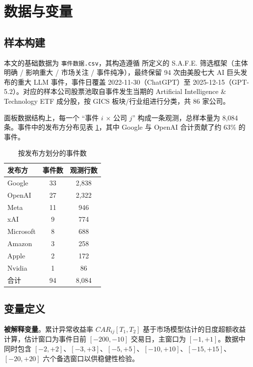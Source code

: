 \documentclass[11pt]{ctexart}
\begin{document}
\section{数据与变量}
\label{sec:data}

\subsection{样本构建}

本文的基础数据为 \texttt{事件数据.csv}，其构造遵循 \cite{proposal} 所定义的 S.A.F.E. 筛选框架（主体明确 / 影响重大 / 市场关注 / 事件纯净），最终保留 94 次由美股七大 AI 巨头发布的重大 LLM 事件，事件日覆盖 2022-11-30（ChatGPT）至 2025-12-15（GPT-5.2）。对应的样本公司股票池取自事件发生当期的 Artificial Intelligence \& Technology ETF 成分股，按 GICS 板块/行业组进行分类，共 86 家公司。

面板数据结构上，每一个 “事件 $i$ $\times$ 公司 $j$” 构成一条观测，总样本量为 8{,}084 条。事件中的发布方分布见表 \ref{tab:publisher_dist}，其中 Google 与 OpenAI 合计贡献了约 63\% 的事件。

\begin{table}[htbp]
\centering
\caption{按发布方划分的事件数}
\label{tab:publisher_dist}
\small
\begin{tabular}{lcc}
\toprule
发布方 & 事件数 & 观测行数 \\
\midrule
Google      & 33 & 2{,}838 \\
OpenAI      & 27 & 2{,}322 \\
Meta        & 11 &   946 \\
xAI         &  9 &   774 \\
Microsoft   &  8 &   688 \\
Amazon      &  3 &   258 \\
Apple       &  2 &   172 \\
Nvidia      &  1 &    86 \\
\midrule
合计        & 94 & 8{,}084 \\
\bottomrule
\end{tabular}
\end{table}

\subsection{变量定义}

\textbf{被解释变量}。累计异常收益率 $CAR_{ij}[T_1, T_2]$ 基于市场模型估计的日度超额收益计算，估计窗口为事件日前 $[-200,-10]$ 交易日，主窗口为 $[-1,+1]$。数据中同时包含 $[-2,+2]$、$[-3,+3]$、$[-5,+5]$、$[-10,+10]$、$[-15,+15]$、$[-20,+20]$ 六个备选窗口以供稳健性检验。
\end{document}
